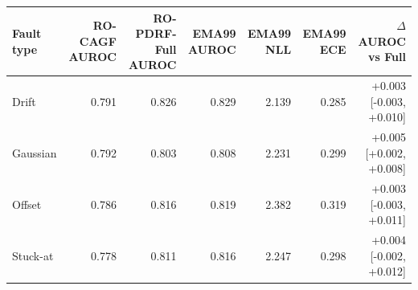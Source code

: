 \begin{tabular}{lrrrrrr}
\toprule
Fault type & RO-CAGF AUROC & RO-PDRF-Full AUROC & EMA99 AUROC & EMA99 NLL & EMA99 ECE & $\Delta$ AUROC vs Full \\
\midrule
Drift & 0.791 & 0.826 & 0.829 & 2.139 & 0.285 & +0.003 [-0.003, +0.010] \\
Gaussian & 0.792 & 0.803 & 0.808 & 2.231 & 0.299 & +0.005 [+0.002, +0.008] \\
Offset & 0.786 & 0.816 & 0.819 & 2.382 & 0.319 & +0.003 [-0.003, +0.011] \\
Stuck-at & 0.778 & 0.811 & 0.816 & 2.247 & 0.298 & +0.004 [-0.002, +0.012] \\
\bottomrule
\end{tabular}